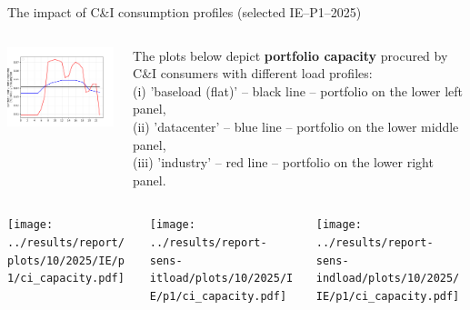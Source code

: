 \begin{frame}{The impact of C\&I consumption profiles (selected IE--P1--2025)}


  {\footnotesize

  \begin{columns}
  \begin{column}{5cm}
  \centering
  \includegraphics[width=5.2cm]{images/profiles.png}
  \end{column}

  \begin{column}{10cm}
  \centering
  {\footnotesize
  The plots below depict {\bf portfolio capacity} procured by C\&I consumers with different load profiles: \\
  (i) 'baseload (flat)' -- black line -- portfolio on the lower left panel, \\
  (ii) 'datacenter' -- blue line -- portfolio on the lower middle panel, \\
  (iii) 'industry' -- red line -- portfolio on the lower right panel. \\
  }
  \end{column}


  \end{columns}

  \begin{columns}
    \begin{column}{5cm}
    \centering
    \texttt{[image: ../results/report/plots/10/2025/IE/p1/ci\_capacity.pdf]}
    \end{column}
  
    \begin{column}{5cm}
    \centering
    \texttt{[image: ../results/report-sens-itload/plots/10/2025/IE/p1/ci\_capacity.pdf]}
    \end{column}
  
    \begin{column}{5cm}
    \centering
    \texttt{[image: ../results/report-sens-indload/plots/10/2025/IE/p1/ci\_capacity.pdf]}
    \end{column}

  \end{columns}

  }


\end{frame}


